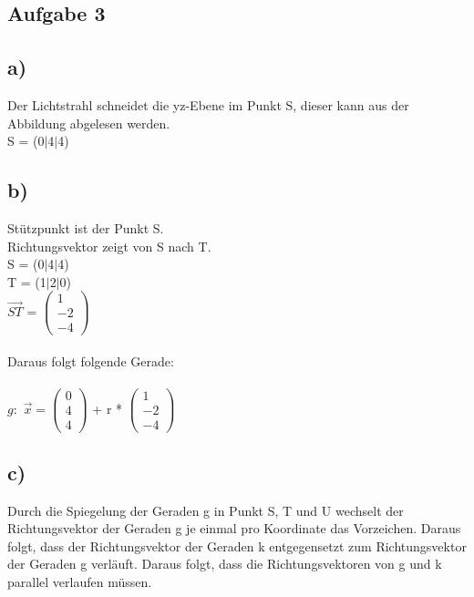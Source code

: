 \documentclass{article}
\begin{document}
	\subsection*{Aufgabe 3}
	\subsection*{a)}
	Der Lichtstrahl schneidet die yz-Ebene im Punkt S, dieser kann aus der Abbildung abgelesen werden. \\
	S = (0$|$4$|$4)
	\subsection*{b)}
	Stützpunkt ist der Punkt S. \\
	Richtungsvektor zeigt von S nach T. \\
	S = (0$|$4$|$4) \\
	T = (1$|$2$|$0) \\
	$\vec{ST} $ = $
	\left(\begin{array}{c}
	1 \\ -2 \\ -4 
	\end{array}\right)
	$ \\ \\
	Daraus folgt folgende Gerade: \\ \\
	$g:$ $\vec{x} = 
	\left(\begin{array}{c}
	0 \\ 4 \\ 4
	\end{array}\right)$
	+ r * 
	$
	\left(\begin{array}{c}
	1 \\ -2 \\ -4
	\end{array}\right)
	$
	
	\subsection*{c)}
	Durch die Spiegelung der Geraden g in Punkt S, T und U wechselt der Richtungsvektor der Geraden g je einmal pro Koordinate das Vorzeichen. Daraus folgt, dass der Richtungsvektor der Geraden k entgegensetzt zum Richtungsvektor der Geraden g verläuft. Daraus folgt, dass die Richtungsvektoren von g und k parallel verlaufen müssen.
\end{document}

